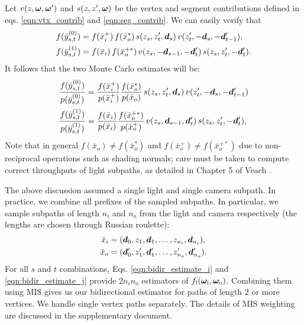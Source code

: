 Let $v(z, \bm\omega, \bm\omega')$ and $s(z, z', \bm\omega)$ be the vertex and segment contributions defined in eqs. \eqref{eqn:vtx_contrib} and \eqref{eqn:seg_contrib}.
We can easily verify that
\begin{align}
	f(\bar{y}_{s,t}^{(0)}) &= f(\bar{x}_i^+) \, f(\bar{x}_o^*) \, s(z_s, z'_t, \bm{d}_s) \, v(z'_t, -\bm{d}_s, -\bm{d}'_{t - 1}),\\
	f(\bar{y}_{s,t}^{(1)}) &= f(\bar{x}_i) \, f(\bar{x}_o^{+*}) \, v(z_s, -\bm{d}_{s - 1}, -\bm{d}'_t) \, s(z_s, z'_t, -\bm{d}'_t).
\end{align}
It follows that the two Monte Carlo estimates will be:
\begin{align}
	\label{eqn:bidir_estimate_i}
	\frac{f(\bar{y}^{(0)}_{s, t})}{p(\bar{y}^{(0)}_{s, t})} &=
	\frac{f(\bar{x}_i^+)}{p(\bar{x}_i^+)}
	\frac{f(\bar{x}_o^*)}{p(\bar{x}_o)}
	\, s(z_s, z'_t, \bm{d}_s) \, v(z'_t, -\bm{d}_s, -\bm{d}'_{t - 1})\\
	\label{eqn:bidir_estimate_j}
	\frac{f(\bar{y}^{(1)}_{s, t})}{p(\bar{y}^{(1)}_{s, t})} &=
	\frac{f(\bar{x}_i)}{p(\bar{x}_i)}
	\frac{f(\bar{x}_o^{+*})}{p(\bar{x}_o^+)}
	\, v(z_s, \bm{d}_{s - 1}, \bm{d}'_t) \, s(z_s, z'_t, -\bm{d}'_t),
\end{align}
Note that in general $f(\bar x_o) \neq f(\bar x_o^*)$ and $f(\bar x_o^+) \neq f(\bar x_o^{+*})$ due to non-reciprocal operations such as shading normals; care must be taken to compute correct throughputs of light subpaths, as detailed in Chapter 5 of Veach \cite{veach1997robust}.

The above discussion assumed a single light and single camera subpath. In practice, we combine all prefixes of the sampled subpaths. In particular, we sample subpaths of length $n_i$ and $n_o$ from the light and camera respectively (the lengths are chosen through Russian roulette):
\begin{equation}
	\begin{aligned}
	\bar{x}_i &= (\bm{d}_0, z_1, \bm{d}_1, \ldots, z_{n_i}, \bm{d}_{n_i}),\\
	\bar{x}_o &= (\bm{d}'_0, z'_1, \bm{d}'_1, \ldots, z'_{n_o}, \bm{d}'_{n_o}).
	\end{aligned}
\end{equation}
For all $s$ and $t$ combinations, Eqs. \eqref{eqn:bidir_estimate_i} and \eqref{eqn:bidir_estimate_j} provide $2 n_i n_o$ estimators of $f_\mathrm{l}(\bm\omega_\mathrm{i}, \bm\omega_\mathrm{o})$.
Combining them using MIS gives us our bidirectional estimator for paths of length 2 or more vertices. We handle single vertex paths separately. The details of MIS weighting are discussed in the supplementary document.


